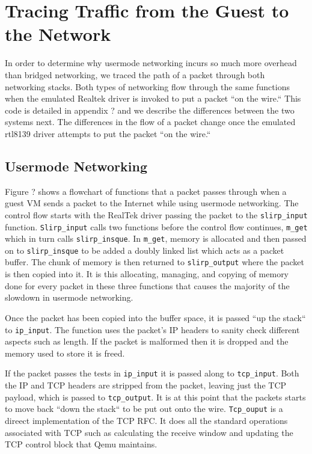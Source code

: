 \section{Tracing Traffic from the Guest to the Network}
\label{sec:trace}

In order to determine why usermode networking incurs so much more overhead than bridged networking, we traced the path of a packet through both networking stacks.
Both types of networking flow through the same functions when the emulated Realtek driver is invoked to put a packet ``on the wire.``
This code is detailed in appendix ? and we describe the differences between the two systems next.
The differences in the flow of a packet change once the emulated rtl8139 driver attempts to put the packet ``on the wire.``

\subsection{Usermode Networking}
\label{subsec:usermode}

Figure ? shows a flowchart of functions that a packet passes through when a guest VM sends a packet to the Internet while using usermode networking.
The control flow starts with the RealTek driver passing the packet to the \texttt{slirp_input} function.
\texttt{Slirp_input} calls two functions before the control flow continues, \texttt{m_get} which in turn calls \texttt{slirp_insque}.
In \texttt{m_get}, memory is allocated and then passed on to \texttt{slirp_insque} to be added a doubly linked list which acts as a packet buffer.
The chunk of memory is then returned to \texttt{slirp_output} where the packet is then copied into it. %
It is this allocating, managing, and copying of memory done for every packet in these three functions that causes the majority of the slowdown in usermode networking.

Once the packet has been copied into the buffer space, it is passed ``up the stack`` to \texttt{ip_input}. 
The function uses the packet's IP headers to sanity check different aspects such as length.
If the packet is malformed then it is dropped and the memory used to store it is freed.

If the packet passes the tests in \texttt{ip_input} it is passed along to \texttt{tcp_input}.
Both the IP and TCP headers are stripped from the packet, leaving just the TCP payload, which is passed to \texttt{tcp_output}.
It is at this point that the packets starts to move back ``down the stack`` to be put out onto the wire.
\texttt{Tcp_ouput} is a direect implementation of the TCP RFC.
It does all the standard operations associated with TCP such as calculating the receive window and updating the TCP control block that Qemu maintains.

